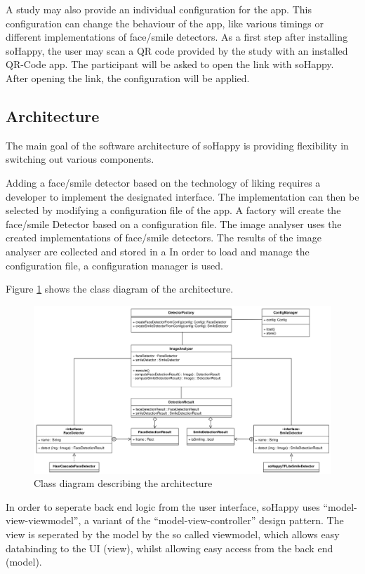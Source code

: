 A study may also provide an individual configuration for the app. This configuration
can change the behaviour of the app, like various timings or different implementations
of face/smile detectors.
As a first step after installing soHappy, the user may scan a QR code provided
by the study with an installed QR-Code app. The participant will be asked to open the
link with soHappy. After opening the link, the configuration will be applied.

\subsection{Architecture}

The main goal of the software architecture of soHappy is providing flexibility 
in switching out various components.

Adding a face/smile detector based on the technology of liking requires a
developer to implement the designated interface. The implementation can then be 
selected by modifying a configuration file of the app. A factory will create 
the face/smile Detector based on a configuration file. 
The image analyser uses the created implementations of face/smile
detectors. The results of the image analyser are collected and stored in a
In order to load and manage the configuration file, a configuration manager 
is used.

Figure \ref{fig:arch1} shows the class diagram of the architecture.

\begin{figure}
    \includegraphics[width=\linewidth]{figures/methodology_architecture_1.png}
    \caption{Class diagram describing the architecture}
    \label{fig:arch1}
\end{figure}

In order to seperate back end logic from the user interface, soHappy uses
``model-view-viewmodel'', a variant of the ``model-view-controller'' design 
pattern. The view is seperated by the model by the so called viewmodel, which
allows easy databinding to the UI (view), whilst allowing easy access from the
back end (model). \cite{mvvm}

